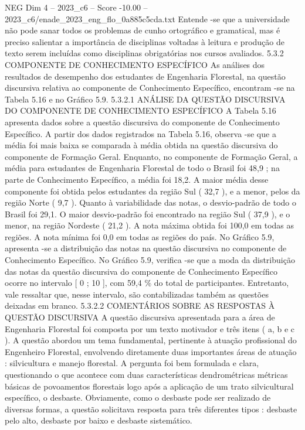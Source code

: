 \begin{textsample}{NEG Dim 4 – 2023\_c6 – Score -10.00 – 2023\_c6/enade\_2023\_eng\_flo\_0a885c5cda.txt}
Entende -se que a universidade não pode sanar todos os problemas de cunho ortográfico e gramatical, mas é preciso salientar a importância de disciplinas voltadas à leitura e produção de texto serem incluídas como disciplinas obrigatórias nos cursos avaliados. 5.3.2 COMPONENTE DE CONHECIMENTO ESPECÍFICO As análises dos resultados de desempenho dos estudantes de Engenharia Florestal, na questão discursiva relativa ao componente de Conhecimento Específico, encontram -se na Tabela 5.16 e no Gráfico 5.9. 5.3.2.1 ANÁLISE DA QUESTÃO DISCURSIVA DO COMPONENTE DE CONHECIMENTO ESPECÍFICO A Tabela 5.16 apresenta dados sobre a questão discursiva do componente de Conhecimento Específico.
A partir dos dados registrados na Tabela 5.16, observa -se que a média foi mais baixa se comparada à média obtida na questão discursiva do componente de Formação Geral.
Enquanto, no componente de Formação Geral, a média para estudantes de Engenharia Florestal de todo o Brasil foi 48,9 ; na parte de Conhecimento Específico, a média foi 18,2.
A maior média desse componente foi obtida pelos estudantes da região Sul ( 32,7 ), e a menor, pelos da região Norte ( 9,7 ).
Quanto à variabilidade das notas, o desvio-padrão de todo o Brasil foi 29,1.
O maior desvio-padrão foi encontrado na região Sul ( 37,9 ), e o menor, na região Nordeste ( 21,2 ).
A nota máxima obtida foi 100,0 em todas as regiões.
A nota mínima foi 0,0 em todas as regiões do país.
No Gráfico 5.9, apresenta -se a distribuição das notas na questão discursiva no componente de Conhecimento Específico.
No Gráfico 5.9, verifica -se que a moda da distribuição das notas da questão discursiva do componente de Conhecimento Específico ocorre no intervalo [ 0 ; 10 ], com 59,4 \% do total de participantes.
Entretanto, vale ressaltar que, nesse intervalo, são contabilizadas também as questões deixadas em branco. 5.3.2.2 COMENTÁRIOS SOBRE AS RESPOSTAS À QUESTÃO DISCURSIVA A questão discursiva apresentada para a área de Engenharia Florestal foi composta por um texto motivador e três itens ( a, b e c ).
A questão abordou um tema fundamental, pertinente à atuação profissional do Engenheiro Florestal, envolvendo diretamente duas importantes áreas de atuação : silvicultura e manejo florestal.
A pergunta foi bem formulada e clara, questionando o que acontece com duas características dendrométricas métricas básicas de povoamentos florestais logo após a aplicação de um trato silvicultural específico, o desbaste.
Obviamente, como o desbaste pode ser realizado de diversas formas, a questão solicitava resposta para três diferentes tipos : desbaste pelo alto, desbaste por baixo e desbaste sistemático.

\end{textsample}
